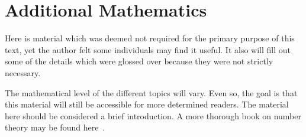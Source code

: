 \chapter{Additional Mathematics}
\label{app:math}

Here is material which was deemed not required for the
primary purpose of this text,
yet the author felt some individuals may find it useful.
It also will fill out some of the details which were glossed
over because they were not strictly necessary.

The mathematical level of the different topics will vary.
Even so, the goal is that this material will still be accessible
for more determined readers.
The material here should be considered a brief introduction.
A more thorough book on \gls{number theory} may be found
here~\cite{ComputationalIntroNTA}.





